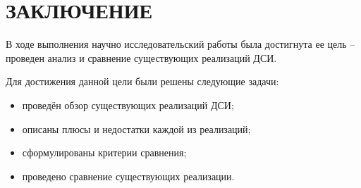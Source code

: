 \section*{ЗАКЛЮЧЕНИЕ}

В ходе выполнения научно исследовательский работы была достигнута ее цель -- проведен анализ и сравнение существующих реализаций ДСИ.

Для достижения данной цели были решены следующие задачи:

\begin{itemize}
	\item проведён обзор существующих реализаций ДСИ;
	\item описаны плюсы и недостатки каждой из реализаций;
	\item сформулированы критерии сравнения;
	\item проведено сравнение существующих реализации.
\end{itemize}

\pagebreak
